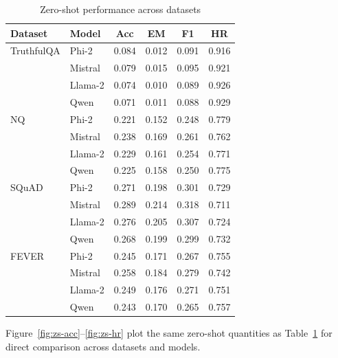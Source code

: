 \documentclass[sigconf,nonacm]{acmart}
\begin{document}
\begin{table}[H]
\centering
\caption{Zero-shot performance across datasets}
\label{tab:zeroshot}
\begin{tabular}{l lcccc}
\hline
Dataset & Model & Acc & EM & F1 & HR \\
\hline
TruthfulQA & Phi-2      & 0.084 & 0.012 & 0.091 & 0.916 \\
           & Mistral    & 0.079 & 0.015 & 0.095 & 0.921 \\
           & Llama-2    & 0.074 & 0.010 & 0.089 & 0.926 \\
           & Qwen       & 0.071 & 0.011 & 0.088 & 0.929 \\

NQ         & Phi-2      & 0.221 & 0.152 & 0.248 & 0.779 \\
           & Mistral    & 0.238 & 0.169 & 0.261 & 0.762 \\
           & Llama-2    & 0.229 & 0.161 & 0.254 & 0.771 \\
           & Qwen       & 0.225 & 0.158 & 0.250 & 0.775 \\

SQuAD      & Phi-2      & 0.271 & 0.198 & 0.301 & 0.729 \\
           & Mistral    & 0.289 & 0.214 & 0.318 & 0.711 \\
           & Llama-2    & 0.276 & 0.205 & 0.307 & 0.724 \\
           & Qwen       & 0.268 & 0.199 & 0.299 & 0.732 \\

FEVER      & Phi-2      & 0.245 & 0.171 & 0.267 & 0.755 \\
           & Mistral    & 0.258 & 0.184 & 0.279 & 0.742 \\
           & Llama-2    & 0.249 & 0.176 & 0.271 & 0.751 \\
           & Qwen       & 0.243 & 0.170 & 0.265 & 0.757 \\
\hline
\end{tabular}
\end{table}
\noindent Figure~\ref{fig:zs-acc}--\ref{fig:zs-hr} plot the same zero-shot quantities as Table~\ref{tab:zeroshot} for direct comparison across datasets and models.
\end{document}
